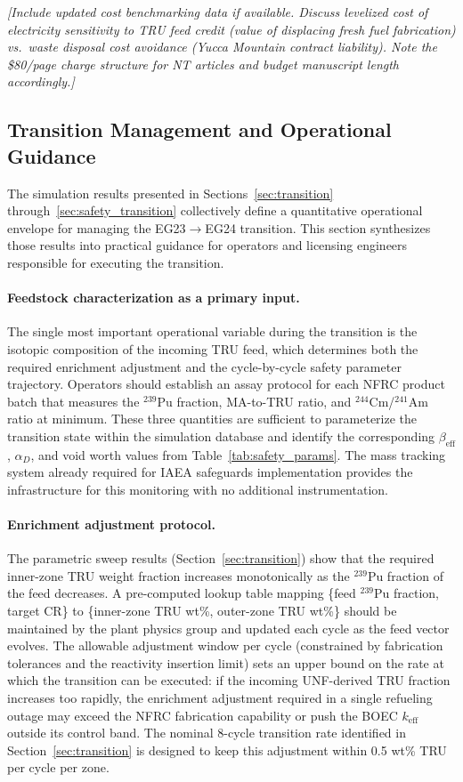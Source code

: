 \documentclass[10pt,twoside]{article}
\newcommand{\placeholder}[1]{%
  \textcolor{placeholder}{\textit{[#1]}}}
\begin{document}
\placeholder{Include updated cost benchmarking data if available.
  Discuss levelized cost of electricity sensitivity to TRU feed credit
  (value of displacing fresh fuel fabrication) vs.\ waste disposal
  cost avoidance (Yucca Mountain contract liability).
  Note the \$80/page charge structure for NT articles and budget
  manuscript length accordingly.}

\subsection{Transition Management and Operational Guidance}
\label{sec:opsguidance}

The simulation results presented in Sections~\ref{sec:transition}
through~\ref{sec:safety_transition} collectively define a
quantitative operational envelope for managing the
EG23$\rightarrow$EG24 transition.  This section synthesizes
those results into practical guidance for operators and
licensing engineers responsible for executing the transition.

\paragraph{Feedstock characterization as a primary input.}
The single most important operational variable during the
transition is the isotopic composition of the incoming TRU
feed, which determines both the required enrichment adjustment
and the cycle-by-cycle safety parameter trajectory.  Operators
should establish an assay protocol for each NFRC product batch
that measures the $^{239}$Pu fraction, MA-to-TRU ratio, and
$^{244}$Cm/$^{241}$Am ratio at minimum.  These three quantities
are sufficient to parameterize the transition state within
the simulation database and identify the corresponding
$\beta_\text{eff}$, $\alpha_D$, and void worth values from
Table~\ref{tab:safety_params}.  The mass tracking system
already required for IAEA safeguards implementation provides
the infrastructure for this monitoring with no additional
instrumentation.\cite{Till2011}

\paragraph{Enrichment adjustment protocol.}
The parametric sweep results (Section~\ref{sec:transition})
show that the required inner-zone TRU weight fraction increases
monotonically as the $^{239}$Pu fraction of the feed decreases.
A pre-computed lookup table mapping \{feed $^{239}$Pu fraction,
target CR\} to \{inner-zone TRU wt\%, outer-zone TRU wt\%\}
should be maintained by the plant physics group and updated
each cycle as the feed vector evolves.  The allowable
adjustment window per cycle (constrained by fabrication
tolerances and the reactivity insertion limit) sets an upper
bound on the rate at which the transition can be executed:
if the incoming UNF-derived TRU fraction increases too
rapidly, the enrichment adjustment required in a single
refueling outage may exceed the NFRC fabrication capability
or push the BOEC $k_\text{eff}$ outside its control band.
The nominal 8-cycle transition rate identified in
Section~\ref{sec:transition} is designed to keep this
adjustment within 0.5 wt\% TRU per cycle per zone.
\end{document}
